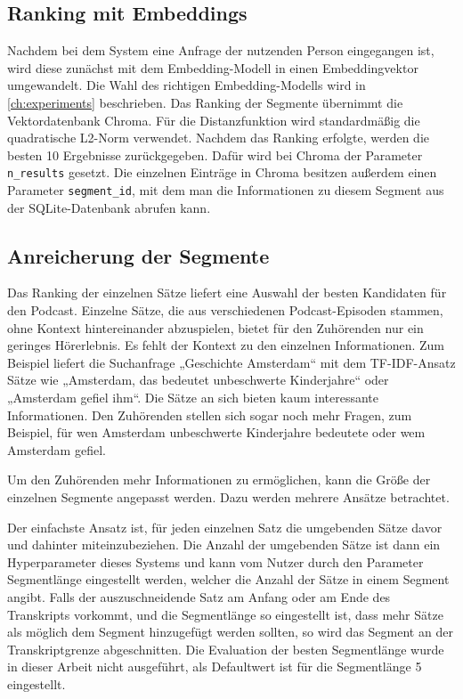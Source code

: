 \subsection{Ranking mit Embeddings}

Nachdem bei dem System eine Anfrage der nutzenden Person eingegangen ist, wird diese zunächst mit dem Embedding-Modell in einen Embeddingvektor umgewandelt.
Die Wahl des richtigen Embedding-Modells wird in \autoref{ch:experiments} beschrieben.
Das Ranking der Segmente übernimmt die Vektordatenbank Chroma.
Für die Distanzfunktion wird standardmäßig die quadratische L2-Norm verwendet.
Nachdem das Ranking erfolgte, werden die besten 10 Ergebnisse zurückgegeben.
Dafür wird bei Chroma der Parameter \verb|n_results| gesetzt.
Die einzelnen Einträge in Chroma besitzen außerdem einen Parameter \verb|segment_id|, mit dem man die Informationen zu diesem Segment aus der SQLite-Datenbank abrufen kann.


\subsection{Anreicherung der Segmente}

Das Ranking der einzelnen Sätze liefert eine Auswahl der besten Kandidaten für den Podcast.
Einzelne Sätze, die aus verschiedenen Podcast-Episoden stammen, ohne Kontext hintereinander abzuspielen, bietet für den Zuhörenden nur ein geringes Hörerlebnis.
Es fehlt der Kontext zu den einzelnen Informationen.
Zum Beispiel liefert die Suchanfrage „Geschichte Amsterdam“ mit dem TF-IDF-Ansatz Sätze wie „Amsterdam, das bedeutet unbeschwerte Kinderjahre“ oder „Amsterdam gefiel ihm“.
Die Sätze an sich bieten kaum interessante Informationen.
Den Zuhörenden stellen sich sogar noch mehr Fragen, zum Beispiel, für wen Amsterdam unbeschwerte Kinderjahre bedeutete oder wem Amsterdam gefiel.

Um den Zuhörenden mehr Informationen zu ermöglichen, kann die Größe der einzelnen Segmente angepasst werden.
Dazu werden mehrere Ansätze betrachtet.

Der einfachste Ansatz ist, für jeden einzelnen Satz die umgebenden Sätze davor und dahinter miteinzubeziehen.
Die Anzahl der umgebenden Sätze ist dann ein Hyperparameter dieses Systems und kann vom Nutzer durch den Parameter Segmentlänge eingestellt werden, welcher die Anzahl der Sätze in einem Segment angibt.
Falls der auszuschneidende Satz am Anfang oder am Ende des Transkripts vorkommt, und die Segmentlänge so eingestellt ist, dass mehr Sätze als möglich dem Segment hinzugefügt werden sollten, so wird das Segment an der Transkriptgrenze abgeschnitten.
Die Evaluation der besten Segmentlänge wurde in dieser Arbeit nicht ausgeführt, als Defaultwert ist für die Segmentlänge 5 eingestellt.

